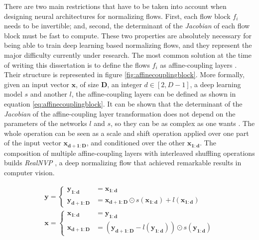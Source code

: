 There are two main restrictions that have to be taken into account when designing neural architectures for normalizing flows. First, each flow block $f_i$ needs to be invertible; and, second, the determinant of the \textit{Jacobian} of each flow block must be fast to compute. These two properties are absolutely necessary for being able to train deep learning based normalizing flows, and they represent the major difficulty currently under research. The most common solution at the time of writing this dissertation is to define the flows $f_i$ as affine-coupling layers \autocite{dinh2018}. Their structure is represented in figure \ref{fig:affinecouplingblock}. More formally, given an input vector $\mathbf{x}$, of size $\mathbf{D}$, an integer $d \in [2,D-1]$, a deep learning model $s$ and another $l$, the affine-coupling layers can be defined as shown in equation \ref{eq:affinecouplingblock}. It can be shown that the determinant of the \textit{Jacobian} of the affine-coupling layer transformation does not depend on the parameters of the networks $l$ and $s$, so they can be as complex as one wants \autocite{dinh2018}. The whole operation can be seen as a scale and shift operation applied over one part of the input vector $\mathbf{x_{d+1:D}}$, and conditioned over the other $\mathbf{x_{1:d}}$. The composition of multiple affine-coupling layers with interleaved shuffling operations builds \textit{RealNVP} \autocite{dinh2018}, a deep normalizing flow that achieved remarkable results in computer vision.

\begin{equation}
\label{eq:affinecouplingblock}
\begin{gathered}
	 \mathbf{y} = \begin{cases} \mathbf{y_{1: d}} & = \mathbf{x_{1: d}} \\
	\mathbf{y_{d+1: D}} & =\mathbf{x_{d+1: D}} \odot s\left(\mathbf{x_{1: d}}\right)+l\left(\mathbf{x_{1: d}}\right)\end{cases} \\
	\mathbf{x} = \begin{cases}
	\mathbf{x_{1: d}} &=\mathbf{y_{1: d}} \\
	\mathbf{x_{d+1: D}} &=\left(\mathbf{y_{d+1: D}}-l\left(\mathbf{y_{1: d}}\right)\right) \odot s\left(\mathbf{y_{1: d}}\right)
	\end{cases}
\end{gathered}
\end{equation}

